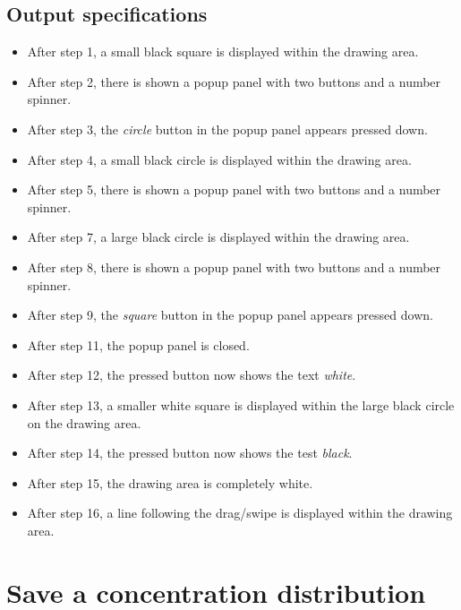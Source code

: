 \subsection*{Output specifications}
\begin{itemize}
\item After step 1, a small black square is displayed within the drawing area.
\item After step 2, there is shown a popup panel with two buttons and a number spinner.
\item After step 3, the \emph{circle} button in the popup panel appears pressed down.
\item After step 4, a small black circle is displayed within the drawing area.
\item After step 5, there is shown a popup panel with two buttons and a number spinner.
\item After step 7, a large black circle is displayed within the drawing area.
\item After step 8, there is shown a popup panel with two buttons and a number spinner.
\item After step 9, the \emph{square} button in the popup panel appears pressed down.
\item After step 11, the popup panel is closed.
\item After step 12, the pressed button now shows the text \emph{white}.
\item After step 13, a smaller white square is displayed within the large black circle on the drawing area.
\item After step 14, the pressed button now shows the test \emph{black}.
\item After step 15, the drawing area is completely white.
\item After step 16, a line following the drag/swipe is displayed within the drawing area.
\end{itemize}

\section{Save a concentration distribution}

